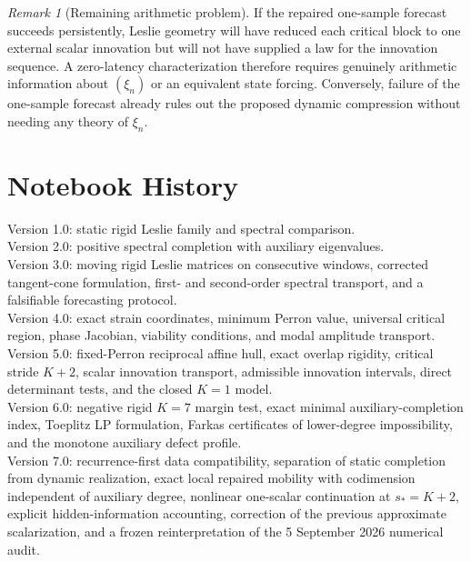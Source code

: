 \documentclass[11pt]{amsart}
\numberwithin{equation}{section}
\theoremstyle{plain}
\theoremstyle{definition}
\theoremstyle{remark}
\newtheorem{remark}[theorem]{Remark}
\begin{document}
\begin{remark}[Remaining arithmetic problem]
\label{rem:remaining_arithmetic_v7}
If the repaired one-sample forecast succeeds persistently, Leslie geometry will have reduced each critical block to one external scalar innovation but will not have supplied a law for the innovation sequence. A zero-latency characterization therefore requires genuinely arithmetic information about $(\xi_n)$ or an equivalent state forcing. Conversely, failure of the one-sample forecast already rules out the proposed dynamic compression without needing any theory of $\xi_n$.
\end{remark}

\section*{Notebook History}
Version 1.0: static rigid Leslie family and spectral comparison.\\
Version 2.0: positive spectral completion with auxiliary eigenvalues.\\
Version 3.0: moving rigid Leslie matrices on consecutive windows, corrected tangent-cone formulation, first- and second-order spectral transport, and a falsifiable forecasting protocol.\\
Version 4.0: exact strain coordinates, minimum Perron value, universal critical region, phase Jacobian, viability conditions, and modal amplitude transport.\\
Version 5.0: fixed-Perron reciprocal affine hull, exact overlap rigidity, critical stride $K+2$, scalar innovation transport, admissible innovation intervals, direct determinant tests, and the closed $K=1$ model.\\
Version 6.0: negative rigid $K=7$ margin test, exact minimal auxiliary-completion index, Toeplitz LP formulation, Farkas certificates of lower-degree impossibility, and the monotone auxiliary defect profile.\\
Version 7.0: recurrence-first data compatibility, separation of static completion from dynamic realization, exact local repaired mobility with codimension independent of auxiliary degree, nonlinear one-scalar continuation at $s_*=K+2$, explicit hidden-information accounting, correction of the previous approximate scalarization, and a frozen reinterpretation of the 5 September 2026 numerical audit.
\end{document}
